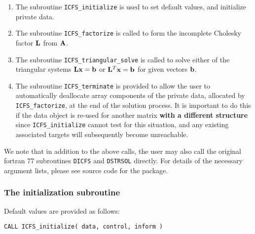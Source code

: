 \documentclass{galahad}
\newcommand{\packagename}{ICFS}
\begin{document}
\begin{enumerate}
\item The subroutine 
      {\tt \packagename\_initialize} 
      is used to set default values, and initialize private data.
\item The subroutine 
      {\tt \packagename\_factorize} 
      is called to form the incomplete Cholesky factor ${\mathbf{L}}$ from ${\mathbf{A}}$.
\item The subroutine 
      {\tt \packagename\_triangular\_solve} 
      is called to solve either of the triangular systems
      ${\mathbf{L}} {\mathbf{x}} = {\mathbf{b}}$ or ${\mathbf{L}}^T {\mathbf{x}} = {\mathbf{b}}$
      for given vectors ${\mathbf{b}}$.
\item The subroutine 
      {\tt \packagename\_terminate} 
      is provided to allow the user to automatically deallocate array 
       components of the private data, allocated by 
       {\tt \packagename\_factorize}, 
       at the end of the solution process. 
       It is important to do this if the data object is re-used for another 
       matrix {\bf with a different structure}
       since {\tt \packagename\_initialize} cannot test for this situation, 
       and any existing associated targets will subsequently become unreachable.
\end{enumerate}

\noindent
We note that in addition to the above calls, the user may also call the
original fortran 77 subroutines {\tt DICFS} and {\tt DSTRSOL} directly.
For details of the necessary argument lists, please see source code 
for the package.



\subsubsection{The initialization subroutine}\label{subinit}
 Default values are provided as follows:
\vspace*{1mm}

\hspace{8mm}
{\tt CALL \packagename\_initialize( data, control, inform )}
\end{document}
